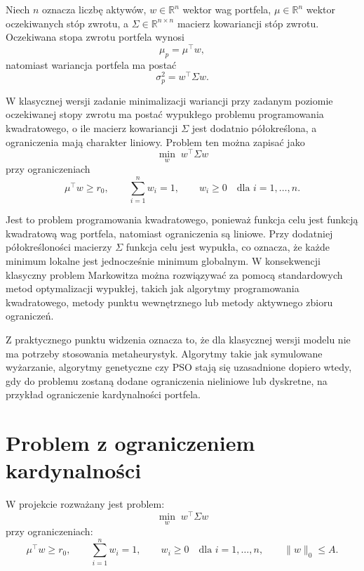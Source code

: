 \documentclass[12pt,a4paper]{article}
\begin{document}
Niech $n$ oznacza liczbę aktywów, $w \in \mathbb{R}^n$ wektor wag portfela, 
$\mu \in \mathbb{R}^n$ wektor oczekiwanych stóp zwrotu, a 
$\Sigma \in \mathbb{R}^{n \times n}$ macierz kowariancji stóp zwrotu. 
Oczekiwana stopa zwrotu portfela wynosi
\[
    \mu_p = \mu^\top w,
\]
natomiast wariancja portfela ma postać
\[
    \sigma_p^2 = w^\top \Sigma w.
\]

W klasycznej wersji zadanie minimalizacji wariancji przy zadanym poziomie oczekiwanej stopy zwrotu ma postać wypukłego problemu programowania kwadratowego, o ile macierz kowariancji $\Sigma$ jest dodatnio półokreślona, a ograniczenia mają charakter liniowy. Problem ten można zapisać jako
\[
    \min_w \; w^\top \Sigma w
\]
przy ograniczeniach
\[
    \mu^\top w \geq r_0, 
    \qquad 
    \sum_{i=1}^{n} w_i = 1,
    \qquad 
    w_i \geq 0 \quad \text{dla } i=1,\dots,n.
\]

Jest to problem programowania kwadratowego, ponieważ funkcja celu jest funkcją kwadratową wag portfela, natomiast ograniczenia są liniowe. Przy dodatniej półokreśloności macierzy $\Sigma$ funkcja celu jest wypukła, co oznacza, że każde minimum lokalne jest jednocześnie minimum globalnym. W konsekwencji klasyczny problem Markowitza można rozwiązywać za pomocą standardowych metod optymalizacji wypukłej, takich jak algorytmy programowania kwadratowego, metody punktu wewnętrznego lub metody aktywnego zbioru ograniczeń.

Z praktycznego punktu widzenia oznacza to, że dla klasycznej wersji modelu nie ma potrzeby stosowania metaheurystyk. Algorytmy takie jak symulowane wyżarzanie, algorytmy genetyczne czy PSO stają się uzasadnione dopiero wtedy, gdy do problemu zostaną dodane ograniczenia nieliniowe lub dyskretne, na przykład ograniczenie kardynalności portfela.

\section{Problem z ograniczeniem kardynalności}

W projekcie rozważany jest problem:
\[
    \min_w \; w^\top \Sigma w
\]
przy ograniczeniach:
\[
    \mu^\top w \geq r_0, 
    \qquad 
    \sum_{i=1}^{n} w_i = 1, 
    \qquad 
    w_i \geq 0 \quad \text{dla } i=1,\dots,n,
    \qquad 
    \|w\|_0 \leq A.
\]
\end{document}
